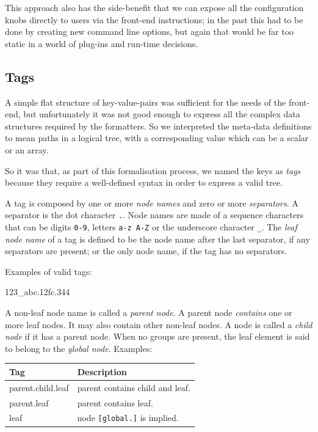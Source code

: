 \documentclass{book}
\begin{document}
This approach also has the side-benefit that we can expose all the
configuration knobs directly to users via the front-end instructions;
in the past this had to be done by creating new command line options,
but again that would be far too static in a world of plug-ins and
run-time decisions.

\subsection{Tags}

A simple flat structure of key-value-pairs was sufficient for the
needs of the front-end, but unfortunately it was not good enough to
express all the complex data structures required by the formatters. So
we interpreted the meta-data definitions to mean paths in a logical
tree, with a corresponding value which can be a scalar or an array.

So it was that, as part of this formalisation process, we named the
keys as \emph{tags} because they require a well-defined syntax in
order to express a valid tree.

A tag is composed by one or more \emph{node names} and zero or more
\emph{separators}. A separator is the dot character \texttt{.}. Node
names are made of a sequence characters that can be digits
\texttt{0-9}, letters \texttt{a-z A-Z} or the underscore character
\texttt{\_}. The \emph{leaf node name} of a tag is defined to be the
node name after the last separator, if any separators are present; or
the only node name, if the tag has no separators.

Examples of valid tags:

\begin{pseudocode}[backgroundcolor=\color{lightgray}]
123_abc.12fc.344
\end{pseudocode}

A non-leaf node name is called a \emph{parent node}. A parent node
\emph{contains} one or more leaf nodes. It may also contain other
non-leaf nodes. A node is called a \emph{child node} if it has a
parent node. When no groups are present, the leaf element is said to
belong to the \emph{global node}. Examples:

\begin{center}
\begin{tabular}{ll}
Tag & Description\\
\hline
parent.child.leaf & parent contains child and leaf.\\
parent.leaf & parent contains leaf.\\
leaf & node \texttt{[global.]} is implied.\\
\end{tabular}
\end{center}
\end{document}
